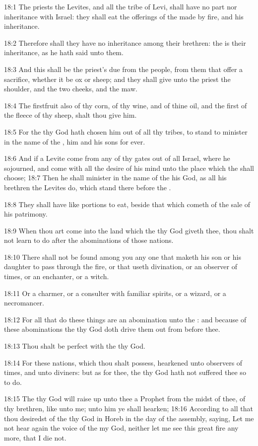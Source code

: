18:1 The priests the Levites, and all the tribe of Levi, shall have no
part nor inheritance with Israel: they shall eat the offerings of the
\LORD made by fire, and his inheritance.

18:2 Therefore shall they have no inheritance among their brethren:
the \LORD is their inheritance, as he hath said unto them.

18:3 And this shall be the priest's due from the people, from them
that offer a sacrifice, whether it be ox or sheep; and they shall give
unto the priest the shoulder, and the two cheeks, and the maw.

18:4 The firstfruit also of thy corn, of thy wine, and of thine oil,
and the first of the fleece of thy sheep, shalt thou give him.

18:5 For the \LORD thy God hath chosen him out of all thy tribes, to
stand to minister in the name of the \LORD, him and his sons for ever.

18:6 And if a Levite come from any of thy gates out of all Israel,
where he sojourned, and come with all the desire of his mind unto the
place which the \LORD shall choose; 18:7 Then he shall minister in the
name of the \LORD his God, as all his brethren the Levites do, which
stand there before the \LORD.

18:8 They shall have like portions to eat, beside that which cometh of
the sale of his patrimony.

18:9 When thou art come into the land which the \LORD thy God giveth
thee, thou shalt not learn to do after the abominations of those
nations.

18:10 There shall not be found among you any one that maketh his son
or his daughter to pass through the fire, or that useth divination, or
an observer of times, or an enchanter, or a witch.

18:11 Or a charmer, or a consulter with familiar spirits, or a wizard,
or a necromancer.

18:12 For all that do these things are an abomination unto the \LORD:
and because of these abominations the \LORD thy God doth drive them out
from before thee.

18:13 Thou shalt be perfect with the \LORD thy God.

18:14 For these nations, which thou shalt possess, hearkened unto
observers of times, and unto diviners: but as for thee, the \LORD thy
God hath not suffered thee so to do.

18:15 The \LORD thy God will raise up unto thee a Prophet from the
midst of thee, of thy brethren, like unto me; unto him ye shall
hearken; 18:16 According to all that thou desiredst of the \LORD thy
God in Horeb in the day of the assembly, saying, Let me not hear again
the voice of the \LORD my God, neither let me see this great fire any
more, that I die not.

